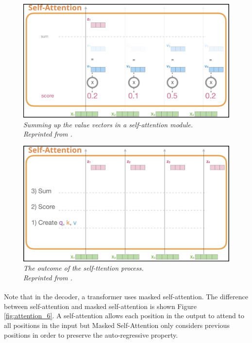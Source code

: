 \begin{figure}[H]
  \centering
  \caption[Summing up the value vectors in a self-attention module.]{\emph{Summing up the value vectors in a self-attention module. \\
  Reprinted from \citeauthor{alammar_2018} \citeyear{alammar_2018}.}}\label{fig:attention_4}
  \includegraphics[scale = 0.3]{figures/attention_4.jpg}  
\end{figure}
\begin{figure}[H]
  \centering
  \caption[The outcome of the self-attention process.]{\emph{The outcome of the self-ttention process. \\Reprinted from \citeauthor{alammar_2018} \citeyear{alammar_2018}.}}\label{fig:attention_5}
  \includegraphics[scale = 0.3]{figures/attention_5.jpg}  
\end{figure}

\paragraph{}
Note that in the decoder, a transformer uses masked self-attention. The difference between self-attention and masked self-attention is shown Figure \ref{fig:attention_6}. A self-attention allows each position in the output to attend to all positions in the input but Masked Self-Attention only considers previous positions in order to preserve the auto-regressive property.

